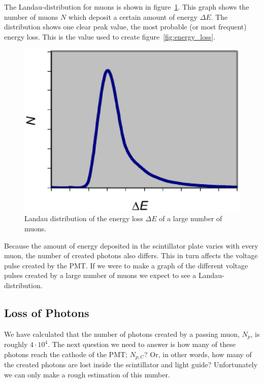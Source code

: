 \documentclass[12pt,a4paper]{article}
\numberwithin{equation}{section}
\numberwithin{figure}{section}
\numberwithin{table}{section}
\begin{document}
The Landau-distribution for muons is shown in figure~\ref{fig:energy_landau}. This graph shows the number of muons $N$ which deposit a certain amount of energy $\Delta E$. The distribution shows one clear peak value, the most probable (or most frequent) energy loss. This is the value used to create figure~\ref{fig:energy_loss}.

\begin{figure}[b]\begin{center}
\includegraphics[scale=0.4]{energy_landau.eps}%
\caption{Landau distribution of the energy loss $\Delta E$ of a large number of muons.}\label{fig:energy_landau}
\end{center}\end{figure}

Because the amount of energy deposited in the scintillator plate varies with every muon, the number of created photons also differs. This in turn affects the voltage pulse created by the PMT. If we were to make a graph of the different voltage pulses created by a large number of muons we expect to see a Landau-distribution.

\subsection{Loss of Photons}
We have calculated that the number of photons created by a passing muon, $N_p$, is roughly $4 \cdot 10^4$. The next question we need to answer is how many of these photons reach the cathode of the PMT; $N_{p,C}$? Or, in other words, how many of the created photons are lost inside the scintillator and light guide? Unfortunately we can only make a rough estimation of this number.
\end{document}
